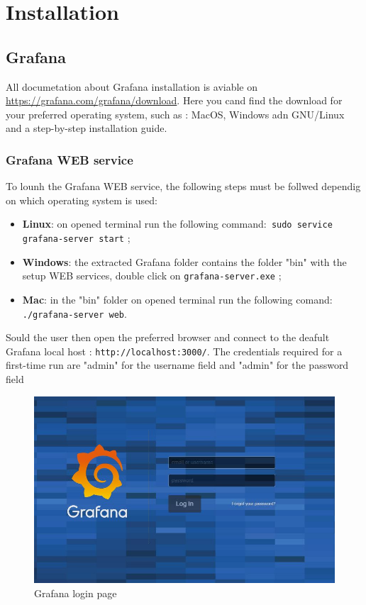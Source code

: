 \section{Installation}
\subsection{Grafana}
All documetation about Grafana installation is aviable on \href{URL}{https://grafana.com/grafana/download}.
Here you cand find the download for your preferred operating system, such as : MacOS, Windows adn GNU\slash Linux and a step-by-step installation guide.
\subsubsection{Grafana WEB service}

To lounh the Grafana WEB service, the following steps must be follwed dependig on which operating system is used:

\begin{itemize}
\item\textbf{Linux}: on opened terminal run the following command:\texttt{ sudo service grafana-server start} ;
\item\textbf{Windows}: the extracted Grafana folder contains the folder "bin" with the setup WEB services, double click on \texttt{grafana-server.exe} ;
\item\textbf{Mac}: in the "bin" folder on opened terminal run the following comand:\texttt{ ./grafana-server web}.
\end{itemize}

Sould the user then open the preferred browser and connect to the deafult Grafana local host : \texttt{http://localhost:3000/}.
The credentials required for a first-time run are "admin" for the username field and "admin" for the password field
\begin{figure}[H]
\centering
\includegraphics[scale=0.65]{img/install/login.jpg}
\caption{Grafana login page}
\end{figure}